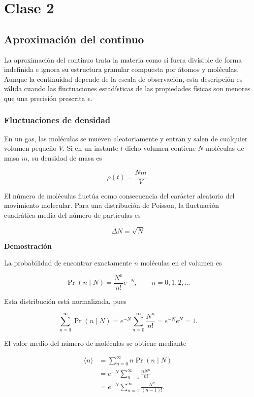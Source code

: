 \shorthandoff{<>}





\shorthandon{<>}

\chapter{Clase 2}

\section{Aproximación del continuo}

La aproximación del continuo trata la materia como si fuera divisible de forma
indefinida e ignora su estructura granular compuesta por átomos y moléculas.
Aunque la continuidad depende de la escala de observación, esta descripción es
válida cuando las fluctuaciones estadísticas de las propiedades físicas son
menores que una precisión prescrita $\epsilon$.

\subsection{Fluctuaciones de densidad}

En un gas, las moléculas se mueven aleatoriamente y entran y salen de cualquier
volumen pequeño $V$. Si en un instante $t$ dicho volumen contiene $N$
moléculas de masa $m$, su densidad de masa es

$$
\rho(t)=\frac{Nm}{V}.
$$

El número de moléculas fluctúa como consecuencia del carácter aleatorio del
movimiento molecular. Para una distribución de Poisson, la fluctuación cuadrática media del número de partículas es

$$\Delta N=\sqrt{N}$$

\textbf{Demostración}

La probabilidad de encontrar exactamente $n$ moléculas en el volumen es

$$
\Pr(n\mid N)=\frac{N^n}{n!}e^{-N},
\qquad n=0,1,2,\ldots
$$

Esta distribución está normalizada, pues

$$
\sum_{n=0}^{\infty}\Pr(n\mid N)
=e^{-N}\sum_{n=0}^{\infty}\frac{N^n}{n!}
=e^{-N}e^N
=1.
$$

El valor medio del número de moléculas se obtiene mediante

$$
\begin{aligned}
\langle n\rangle
&=\sum_{n=0}^{\infty}n\Pr(n\mid N)\\
&=e^{-N}\sum_{n=1}^{\infty}\frac{nN^n}{n!}\\
&=e^{-N}\sum_{n=1}^{\infty}\frac{N^n}{(n-1)!}.
\end{aligned}
$$

